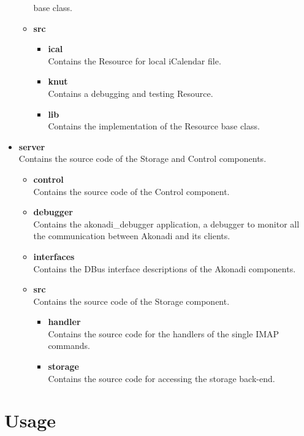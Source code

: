 \documentclass[]{report}
\begin{document}
\begin{itemize}
\begin{itemize}
      base class.
    \item \textbf{src}\\
    \begin{itemize}
      \item \textbf{ical}\\
        Contains the Resource for local iCalendar file.
      \item \textbf{knut}\\
        Contains a debugging and testing Resource.
      \item \textbf{lib}\\
        Contains the implementation of the Resource base class.
    \end{itemize}
  \end{itemize}
  \item \textbf{server}\\
    Contains the source code of the Storage and Control components.
  \begin{itemize}
    \item \textbf{control}\\
      Contains the source code of the Control component.
    \item \textbf{debugger}\\
      Contains the akonadi\_debugger application, a debugger to monitor all the communication
      between Akonadi and its clients.
    \item \textbf{interfaces}\\
      Contains the DBus interface descriptions of the Akonadi components.
    \item \textbf{src}\\
      Contains the source code of the Storage component.
    \begin{itemize}
      \item \textbf{handler}\\
        Contains the source code for the handlers of the single IMAP commands.
      \item \textbf{storage}\\
        Contains the source code for accessing the storage back-end.
    \end{itemize}
  \end{itemize}
\end{itemize}

\chapter{Usage}
\end{document}

